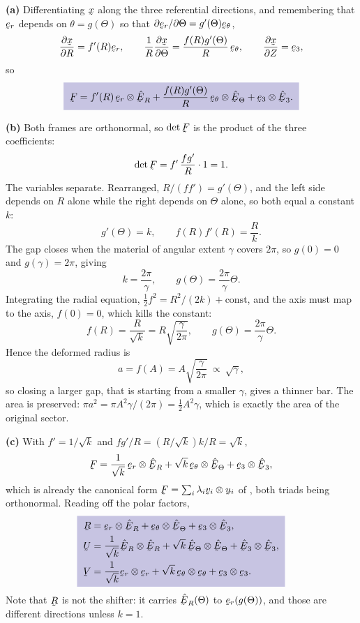 \begin{solution}
\textbf{(a)} Differentiating $\bx$ along the three referential
directions, and remembering that $\ber$ depends on $\theta=g(\Theta)$
so that $\partial\ber/\partial\Theta=g'(\Theta)\bet$,
\[
   \frac{\partial\bx}{\partial R}=f'(R)\ber,\qquad
   \frac{1}{R}\frac{\partial\bx}{\partial\Theta}
   =\frac{f(R)g'(\Theta)}{R}\,\bet,\qquad
   \frac{\partial\bx}{\partial Z}=\be_{3},
\]
so
\[
   \boxed{\;\bF=f'(R)\,\ber\otimes\hbE_{R}
   +\frac{f(R)g'(\Theta)}{R}\,\bet\otimes\hbE_{\Theta}
   +\be_{3}\otimes\hbE_{3} .\;}
\]

\textbf{(b)} Both frames are orthonormal, so $\det\bF$ is the product of
the three coefficients:
\[
   \det\bF=f'\,\frac{fg'}{R}\cdot1=1 .
\]
The variables separate. Rearranged, $R/(ff')=g'(\Theta)$, and the left
side depends on $R$ alone while the right depends on $\Theta$ alone, so
both equal a constant $k$:
\[
   g'(\Theta)=k,\qquad f(R)f'(R)=\frac{R}{k} .
\]
The gap closes when the material of angular extent $\gamma$ covers
$2\pi$, so $g(0)=0$ and $g(\gamma)=2\pi$, giving
\[
   k=\frac{2\pi}{\gamma},\qquad g(\Theta)=\frac{2\pi}{\gamma}\Theta .
\]
Integrating the radial equation, $\tfrac12f^{2}=R^{2}/(2k)+\text{const}$,
and the axis must map to the axis, $f(0)=0$, which kills the constant:
\[
   \boxed{\;f(R)=\frac{R}{\sqrt k}=R\sqrt{\frac{\gamma}{2\pi}},
   \qquad g(\Theta)=\frac{2\pi}{\gamma}\Theta .\;}
\]
Hence the deformed radius is
\[
   a=f(A)=A\sqrt{\frac{\gamma}{2\pi}}\ \propto\ \sqrt\gamma ,
\]
so closing a larger gap, that is starting from a smaller $\gamma$, gives
a thinner bar. The area is preserved: $\pi a^{2}=\pi A^{2}\gamma/(2\pi)
=\tfrac12 A^{2}\gamma$, which is exactly the area of the original
sector.

\textbf{(c)} With $f'=1/\sqrt k$ and $fg'/R=(R/\sqrt k)k/R=\sqrt k$,
\[
   \bF=\frac{1}{\sqrt k}\,\ber\otimes\hbE_{R}
   +\sqrt k\,\bet\otimes\hbE_{\Theta}+\be_{3}\otimes\hbE_{3},
\]
which is already the canonical form $\bF=\sum_{i}\lambda_{i}
\bv_{i}\otimes\bu_{i}$ of , both triads being orthonormal.
Reading off the polar factors,
\[
   \boxed{\;
\begin{aligned}
   \bR&=\ber\otimes\hbE_{R}+\bet\otimes\hbE_{\Theta}
        +\be_{3}\otimes\hbE_{3},\\
   \bU&=\frac{1}{\sqrt k}\hbE_{R}\otimes\hbE_{R}
        +\sqrt k\,\hbE_{\Theta}\otimes\hbE_{\Theta}
        +\hbE_{3}\otimes\hbE_{3},\\
   \bV&=\frac{1}{\sqrt k}\ber\otimes\ber
        +\sqrt k\,\bet\otimes\bet+\be_{3}\otimes\be_{3} .
\end{aligned}\;}
\]
Note that $\bR$ is not the shifter: it carries $\hbE_{R}(\Theta)$ to
$\ber(g(\Theta))$, and those are different directions unless $k=1$.


\end{solution}
